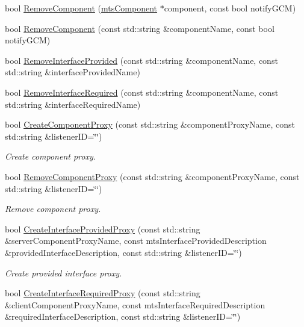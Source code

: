 \begin{DoxyCompactItemize}
\item 
bool \hyperlink{classmts_manager_local_a4cb535c191d77f663bfa38f92a37948f}{Remove\+Component} (\hyperlink{classmts_component}{mts\+Component} $\ast$component, const bool notify\+G\+C\+M)
\item 
bool \hyperlink{classmts_manager_local_a1bab522b229e093d0b4e61c7e7a5e31c}{Remove\+Component} (const std\+::string \&component\+Name, const bool notify\+G\+C\+M)
\item 
bool \hyperlink{classmts_manager_local_a81d9c51989fc1e062fbc0796fc358864}{Remove\+Interface\+Provided} (const std\+::string \&component\+Name, const std\+::string \&interface\+Provided\+Name)
\item 
bool \hyperlink{classmts_manager_local_ad6a62f29de1bef4a01611a2ddd566fa5}{Remove\+Interface\+Required} (const std\+::string \&component\+Name, const std\+::string \&interface\+Required\+Name)
\item 
bool \hyperlink{classmts_manager_local_a200bc8fea319014d8902724564d94481}{Create\+Component\+Proxy} (const std\+::string \&component\+Proxy\+Name, const std\+::string \&listener\+I\+D=\char`\"{}\char`\"{})
\begin{DoxyCompactList}\small\item\em Create component proxy. \end{DoxyCompactList}\item 
bool \hyperlink{classmts_manager_local_ac323b42bdf8078864f78a572625b05e6}{Remove\+Component\+Proxy} (const std\+::string \&component\+Proxy\+Name, const std\+::string \&listener\+I\+D=\char`\"{}\char`\"{})
\begin{DoxyCompactList}\small\item\em Remove component proxy. \end{DoxyCompactList}\item 
bool \hyperlink{classmts_manager_local_a196c71a8ad2532559e6744710954b5aa}{Create\+Interface\+Provided\+Proxy} (const std\+::string \&server\+Component\+Proxy\+Name, const mts\+Interface\+Provided\+Description \&provided\+Interface\+Description, const std\+::string \&listener\+I\+D=\char`\"{}\char`\"{})
\begin{DoxyCompactList}\small\item\em Create provided interface proxy. \end{DoxyCompactList}\item 
bool \hyperlink{classmts_manager_local_a5229948aa578826b68cd5fc0e2ad287e}{Create\+Interface\+Required\+Proxy} (const std\+::string \&client\+Component\+Proxy\+Name, const mts\+Interface\+Required\+Description \&required\+Interface\+Description, const std\+::string \&listener\+I\+D=\char`\"{}\char`\"{})

\end{DoxyCompactItemize}
